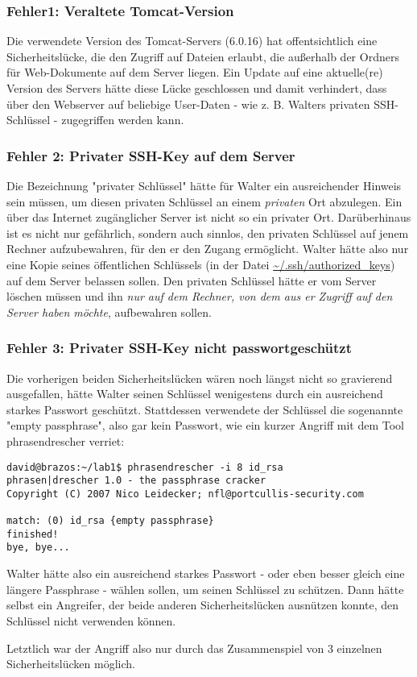 \subsubsection{Fehler1: Veraltete Tomcat-Version}
Die verwendete Version des Tomcat-Servers (6.0.16) hat offentsichtlich eine Sicherheitslücke, die den Zugriff auf Dateien erlaubt, die außerhalb der Ordners für Web-Dokumente auf dem Server liegen. Ein Update auf eine aktuelle(re) Version des Servers hätte diese Lücke geschlossen und damit verhindert, dass über den Webserver auf beliebige User-Daten - wie z. B. Walters privaten SSH-Schlüssel - zugegriffen werden kann.

\subsubsection{Fehler 2: Privater SSH-Key auf dem Server}
Die Bezeichnung "privater Schlüssel" hätte für Walter ein ausreichender Hinweis sein müssen, um diesen privaten Schlüssel an einem \emph{privaten} Ort abzulegen. Ein über das Internet zugänglicher Server ist nicht so ein privater Ort. Darüberhinaus ist es nicht nur gefährlich, sondern auch sinnlos, den privaten Schlüssel auf jenem Rechner aufzubewahren, für den er den Zugang ermöglicht.
Walter hätte also nur eine Kopie seines öffentlichen Schlüssels (in der Datei \url{~/.ssh/authorized_keys}) auf dem Server belassen sollen. Den privaten Schlüssel hätte er vom Server löschen müssen und ihn \emph{nur auf dem Rechner, von dem aus er Zugriff auf den Server haben möchte}, aufbewahren sollen.

\subsubsection{Fehler 3: Privater SSH-Key nicht passwortgeschützt}
Die vorherigen beiden Sicherheitslücken wären noch längst nicht so gravierend ausgefallen, hätte Walter seinen Schlüssel wenigestens durch ein ausreichend starkes Passwort geschützt. Stattdessen verwendete der Schlüssel die sogenannte "empty passphrase", also gar kein Passwort, wie ein kurzer Angriff mit dem Tool phrasendrescher verriet:

\begin{lstlisting}
david@brazos:~/lab1$ phrasendrescher -i 8 id_rsa
phrasen|drescher 1.0 - the passphrase cracker
Copyright (C) 2007 Nico Leidecker; nfl@portcullis-security.com

match: (0) id_rsa {empty passphrase}
finished!
bye, bye...
\end{lstlisting}

Walter hätte also ein ausreichend starkes Passwort - oder eben besser gleich eine längere Passphrase - wählen sollen, um seinen Schlüssel zu schützen. Dann hätte selbst ein Angreifer, der beide anderen Sicherheitslücken ausnützen konnte, den Schlüssel nicht verwenden können.

Letztlich war der Angriff also nur durch das Zusammenspiel von 3 einzelnen Sicherheitslücken möglich.

